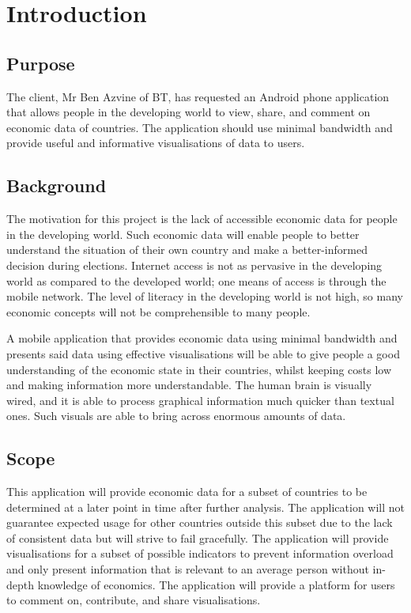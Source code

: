 \documentclass[12pt,a4paper,twoside]{article}
\begin{document}

\newpage
\thispagestyle{empty}
\cleardoublepage
\newpage

\section{Introduction}

\subsection{Purpose}
The client, Mr Ben Azvine of BT, has requested an Android phone application that allows people in the developing world to view, share, and comment on economic data of countries. The application should use minimal bandwidth and provide useful and informative visualisations of data to users.

\subsection{Background}
The motivation for this project is the lack of accessible economic data for people in the developing world. Such economic data will enable people to better understand the situation of their own country and make a better-informed decision during elections. Internet access is not as pervasive in the developing world as compared to the developed world; one means of access is through the mobile network. The level of literacy in the developing world is not high, so many economic concepts will not be comprehensible to many people.

A mobile application that provides economic data using minimal bandwidth and presents said data using effective visualisations will be able to give people a good understanding of the  economic state in their countries, whilst keeping costs low and making information more understandable. The human brain is visually wired, and it is able to process graphical information much quicker than textual ones. Such visuals are able to bring across enormous amounts of data.

\subsection{Scope}
This application will provide economic data for a subset of countries to be determined at a later point in time after further analysis. The application will not guarantee expected usage for other countries outside this subset due to the lack of consistent data but will strive to fail gracefully. The application will provide visualisations for a subset of possible indicators to prevent information overload and only present information that is relevant to an average person without in-depth knowledge of economics. The application will provide a platform for users to comment on, contribute, and share visualisations.
\end{document}
